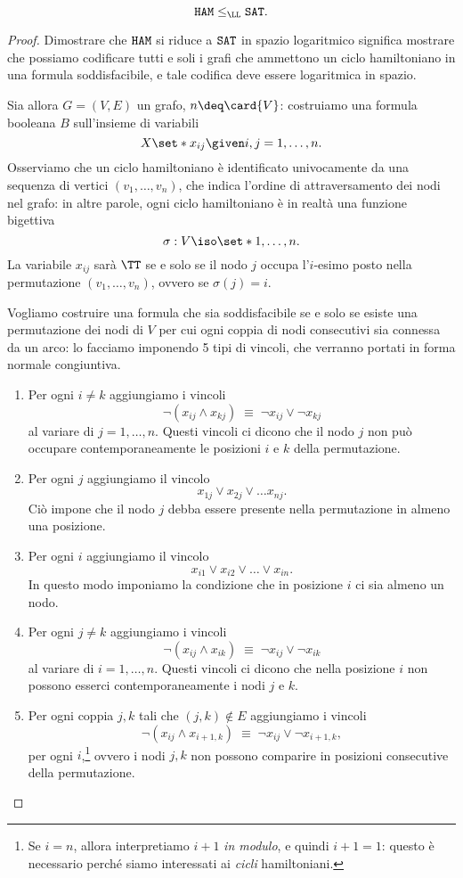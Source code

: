 \begin{theorem}
  \[
      \HAM \leq_{\LL} \SAT.
  \]
\end{theorem}
\begin{proof}
  Dimostrare che $\texttt{HAM}$ si riduce a $\texttt{SAT}$ in spazio logaritmico significa
  mostrare che possiamo codificare tutti e soli i grafi che ammettono un ciclo
  hamiltoniano in una formula soddisfacibile, e tale codifica deve essere
  logaritmica in spazio.

  Sia allora $G = (V, E)$ un grafo, $n \deq \card{V}$: costruiamo una
  formula booleana $B$ sull'insieme di variabili \[
      X \set*{ x_{ij} \given i, j = 1, \dots, n }.
  \] Osserviamo che un ciclo hamiltoniano è identificato univocamente da una
  sequenza di vertici $(v_1, \dots, v_n)$, che indica l'ordine di attraversamento 
  dei nodi nel grafo: in altre parole, ogni ciclo hamiltoniano
  è in realtà una funzione bigettiva \[
      \sigma : V \iso \set*{1, \dots, n}.
  \]  
  La variabile $x_{ij}$ sarà $\TT$ se e solo se il nodo $j$ occupa l'$i$-esimo
  posto nella permutazione $(v_1, \dots, v_n)$, ovvero se $\sigma(j) = i$.  

  Vogliamo costruire una formula che sia soddisfacibile se e solo se esiste una
  permutazione dei nodi di $V$ per cui ogni coppia di nodi consecutivi sia
  connessa da un arco: lo facciamo imponendo 5 tipi di vincoli, che verranno
  portati in forma normale congiuntiva.
  
  \begin{enumerate}[(1)]
    \item Per ogni $i \neq k$ aggiungiamo i vincoli \[
        \neg (x_{ij} \land x_{kj}) \;\equiv\; \neg x_{ij} \lor \neg x_{kj}
    \] al variare di $j = 1, \dots, n$. Questi vincoli ci dicono che il nodo $j$ 
    non può occupare contemporaneamente le posizioni $i$ e $k$ della 
    permutazione.
    \item Per ogni $j$ aggiungiamo il vincolo \[
        x_{1j} \lor x_{2j} \lor \dots x_{nj}.
    \] Ciò impone che il nodo $j$ debba essere presente nella
    permutazione in almeno una posizione.
    \item Per ogni $i$ aggiungiamo il vincolo \[
        x_{i1} \lor x_{i2} \lor \dots \lor x_{in}.
    \] In questo modo imponiamo la condizione che in posizione $i$ ci sia
    almeno un nodo. 
    \item Per ogni $j \neq k$ aggiungiamo i vincoli \[
        \neg (x_{ij} \land x_{ik}) \;\equiv\; \neg x_{ij} \lor \neg x_{ik}
    \] al variare di $i = 1, \dots, n$. Questi vincoli ci dicono che nella
    posizione $i$ non possono esserci contemporaneamente i nodi $j$ e $k$.
    \item Per ogni coppia $j, k$ tali che $(j, k) \notin E$ aggiungiamo i 
    vincoli \[
        \neg (x_{ij} \land x_{i+1, k}) \;\equiv\; 
          \neg x_{ij} \lor \neg x_{i+1, k},
    \] per ogni $i$,\footnote{Se $i = n$, allora interpretiamo $i+1$
    \emph{in modulo}, e quindi $i+1 = 1$: questo è necessario
    perché siamo interessati ai \emph{cicli} hamiltoniani.} 
    ovvero i nodi $j, k$ non possono comparire in posizioni
    consecutive della permutazione. 
  \end{enumerate}


\end{proof}
